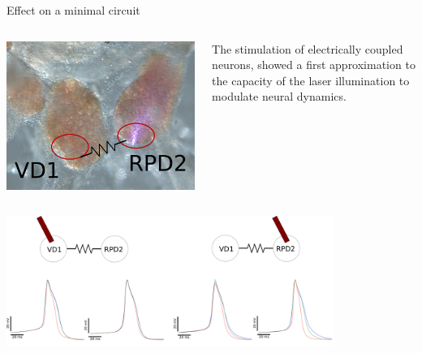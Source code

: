 \documentclass[aspectratio=43]{beamer}
\begin{document}
\begin{frame}{Effect on a minimal circuit}
	
	\begin{columns}
		\begin{column}{0.3\textwidth}
			\includegraphics[width=\textwidth]{Images/electrical_ganglia.png}
		\end{column}
	\vspace{15pt}
		\begin{column}{0.7\textwidth}
			The stimulation of electrically coupled neurons, showed a first approximation to the capacity of the laser illumination to modulate neural dynamics. 
		\end{column}
	\end{columns}
	\centering
	\includegraphics[width=0.8\textwidth]{Images/electrical_result.png}	
\end{frame}
\end{document}
